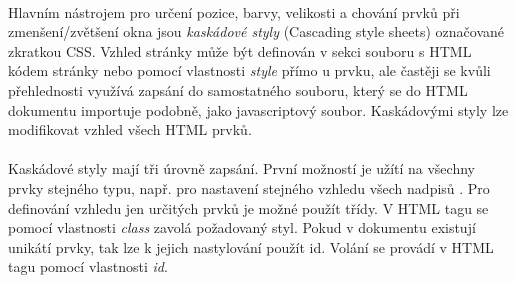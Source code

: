\documentclass[11pt,a4paper,titlepage,oneside]{book}
\begin{document}

		\paragraph{} Hlavním nástrojem pro určení pozice, barvy, velikosti a chování prvků při zmenšení/zvětšení okna jsou \textit{kaskádové styly} (Cascading style sheets) označované zkratkou CSS. Vzhled stránky může být definován v sekci  souboru s HTML kódem stránky nebo pomocí vlastnosti \textit{style} přímo u prvku, ale častěji se kvůli přehlednosti využívá zapsání do samostatného souboru, který se do HTML dokumentu importuje podobně, jako javascriptový soubor. Kaskádovými styly lze modifikovat vzhled všech HTML prvků. 



		\paragraph{} Kaskádové styly mají tři úrovně zapsání. První možností je užítí na všechny prvky stejného typu, např. pro nastavení stejného vzhledu všech nadpisů . Pro definování vzhledu jen určitých prvků je možné použít třídy. V HTML tagu se pomocí vlastnosti \textit{class} zavolá požadovaný styl. Pokud v dokumentu existují unikátí prvky, tak lze k jejich nastylování použít id. Volání se provádí v HTML tagu pomocí vlastnosti \textit{id}.

\end{document}
